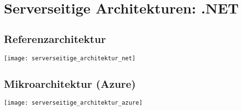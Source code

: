 
\section{Serverseitige Architekturen: .NET}
\subsection{Referenzarchitektur}
\texttt{[image: serverseitige\_architektur\_net]}
\subsection{Mikroarchitektur (Azure)}
\texttt{[image: serverseitige\_architektur\_azure]}